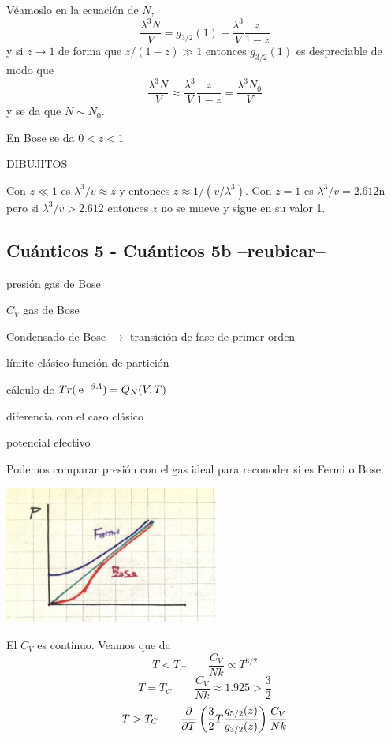 \documentclass[10pt,oneside]{CBFT_book}
\begin{document}
Véamoslo en la ecuación de $N$,
\[
	\frac{\lambda^3 N}{V} = g_{3/2}(1) + \frac{\lambda^3}{V} \frac{z}{1-z}
\]
y si $z \to 1$ de forma que $z/(1-z) \gg 1$ entonces $g_{3/2}(1)$ es despreciable de modo que
\[
	\frac{\lambda^3 N}{V} \approx \frac{\lambda^3}{V} \frac{z}{1-z} = \frac{\lambda^3 N_0}{V} 
\]
y se da que $ N \sim N_0 $.

En Bose se da $ 0 < z < 1$

DIBUJITOS

Con $ z \ll 1$ es $ \lambda^3 / v \approx z $ y entonces $ z \approx 1/ (v/\lambda^3) $.
Con $ z=1 $ es $ \lambda^3 / v = 2.612$n pero si $ \lambda^3 / v > 2.612 $ entonces $z$ no se mueve y
sigue en su valor 1.


\subsection{Cuánticos 5 - Cuánticos 5b --reubicar--}

presión gas de Bose

$C_V$ gas de Bose

Condensado de Bose $\to$ transición de fase de primer orden

límite clásico función de partición

cálculo de $ Tr (\:\mathrm{e}^{-\beta A} ) = Q_N(V,T) $

diferencia con el caso clásico

potencial efectivo


Podemos comparar presión con el gas ideal para reconoder si es Fermi o Bose.

\includegraphics[scale=0.5]{images/1606329551.jpg}


El $C_V$ es continuo. Veamos que da
\[
	T<T_C \qquad \frac{C_V}{Nk} \propto T^{3/2}
\]
\[
	T=T_C \qquad \frac{C_V}{Nk} \approx 1.925 > \frac 3 2
\]
\[
	T>T_C \qquad \frac{\partial^{\hspace{-0.05em}} {}}{\partial {T}^{\hspace{-0.05em}}}\left( \frac{3}{2} T \frac{g_{5/2}(z)}{g_{3/2}(z)} \right) \frac{C_V}{Nk} 
\]


\end{document}
